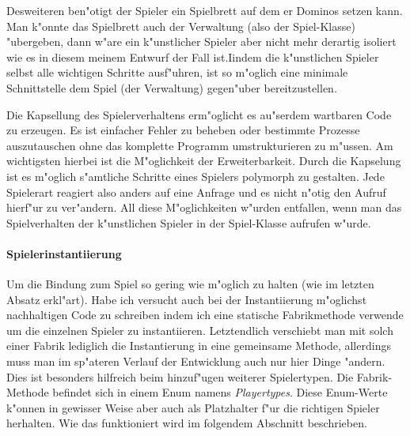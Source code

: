 Desweiteren ben"otigt der Spieler ein Spielbrett auf dem er Dominos setzen kann. Man k"onnte das Spielbrett auch der Verwaltung (also der Spiel-Klasse) "ubergeben, dann w"are ein k"unstlicher Spieler aber nicht mehr derartig isoliert wie es in diesem meinem Entwurf der Fall ist.Iindem die k"unstlichen Spieler selbst alle wichtigen Schritte ausf"uhren, ist so m"oglich eine minimale Schnittstelle dem Spiel (der Verwaltung) gegen"uber bereitzustellen. 

Die Kapsellung des Spielerverhaltens erm"oglicht es au"serdem wartbaren Code zu erzeugen. Es ist einfacher Fehler zu beheben oder bestimmte Prozesse auszutauschen ohne das komplette Programm umstrukturieren zu m"ussen. Am wichtigsten hierbei ist die M"oglichkeit der Erweiterbarkeit. Durch die Kapselung ist es m"oglich s"amtliche Schritte eines Spielers polymorph zu gestalten. Jede Spielerart reagiert also anders auf eine Anfrage und es nicht n"otig den Aufruf hierf"ur zu ver"andern. All diese M"oglichkeiten w"urden entfallen, wenn man das Spielverhalten der k"unstlichen Spieler in der Spiel-Klasse aufrufen w"urde.

\paragraph{Spielerinstantiierung}
Um die Bindung zum Spiel so gering wie m"oglich zu halten (wie im letzten Absatz erkl"art). Habe ich versucht auch bei der Instantiierung m"oglichst nachhaltigen Code zu schreiben indem ich eine statische Fabrikmethode verwende um die einzelnen Spieler zu instantiieren. Letztendlich verschiebt man mit solch einer Fabrik lediglich die Instantierung in eine gemeinsame Methode, allerdings muss man im sp"ateren Verlauf der Entwicklung auch nur hier Dinge "andern. Dies ist besonders hilfreich beim hinzuf"ugen weiterer Spielertypen. Die Fabrik-Methode befindet sich in einem Enum namens \emph{Playertypes}. Diese Enum-Werte k"onnen in gewisser Weise aber auch als Platzhalter f"ur die \glqq richtigen\grqq {} Spieler herhalten. Wie das funktioniert wird im folgendem Abschnitt beschrieben. 

